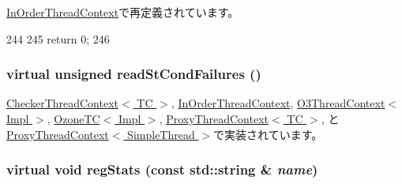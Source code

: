 \hyperlink{classInOrderThreadContext_a207d863e4bad4245020ea32adbaf625a}{InOrderThreadContext}で再定義されています。


\begin{DoxyCode}
244     {
245         return 0;
246     }
\end{DoxyCode}
\hypertarget{classThreadContext_ab1bc64ec54c1cc47c9945fe68fa9e91c}{
\subsubsection[{readStCondFailures}]{\setlength{\rightskip}{0pt plus 5cm}virtual unsigned readStCondFailures ()}}
\label{classThreadContext_ab1bc64ec54c1cc47c9945fe68fa9e91c}


\hyperlink{classCheckerThreadContext_a25b995a791e41965e088d8bf3f2bf859}{CheckerThreadContext$<$ TC $>$}, \hyperlink{classInOrderThreadContext_a25b995a791e41965e088d8bf3f2bf859}{InOrderThreadContext}, \hyperlink{classO3ThreadContext_a8cbbb8eea07477baa78336be358c632b}{O3ThreadContext$<$ Impl $>$}, \hyperlink{classOzoneCPU_1_1OzoneTC_a25b995a791e41965e088d8bf3f2bf859}{OzoneTC$<$ Impl $>$}, \hyperlink{classProxyThreadContext_a25b995a791e41965e088d8bf3f2bf859}{ProxyThreadContext$<$ TC $>$}, と \hyperlink{classProxyThreadContext_a25b995a791e41965e088d8bf3f2bf859}{ProxyThreadContext$<$ SimpleThread $>$}で実装されています。\hypertarget{classThreadContext_a6450b5fad5603ec545c4bf5ff01e0646}{
\subsubsection[{regStats}]{\setlength{\rightskip}{0pt plus 5cm}virtual void regStats (const std::string \& {\em name})}}
\label{classThreadContext_a6450b5fad5603ec545c4bf5ff01e0646}


